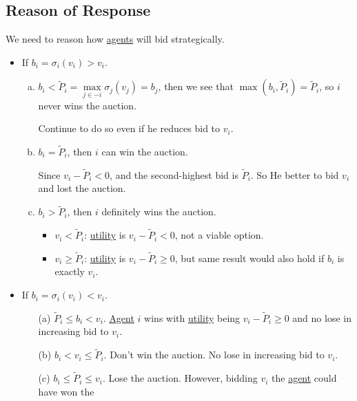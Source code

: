 \subsection{Reason of Response}
We need to reason how \hyperref[def:player]{agents} will bid strategically.
\begin{itemize}
	\item If \(b_{i} = \sigma_{i}(v_{i})>v_{i}\).
	      \begin{enumerate}[(a)]
		      \item \(b_{i}< \widetilde{P}_i = \max\limits_{j\in -i}\sigma_{j}(v_{j}) = b_{j}\), then we see that
		            \(\max(b_{i}, \widetilde{P}_{i}) = \widetilde{P}_{i}\), so \(i\) never wins the auction.
		            \par Continue to do so even if he reduces bid to \(v_{i}\).
		      \item \(b_{i} = \widetilde{P}_{i}\), then \(i\) can win the auction.
		            \par Since \(v_{i} - \widetilde{P}_{i}<0\),  and the second-highest bid is \(\widetilde{P}_{i}\). So He better to bid \(v_{i}\) and
		            lost the auction.
		      \item \(b_{i} > \widetilde{P}_{i}\), then \(i\) definitely wins the auction.
		            \begin{itemize}
			            \item \(v_{i}<\widetilde{P}_{i}\): \hyperref[def:reward]{utility}  is \(v_{i} - \widetilde{P}_{i}<0\), not a viable option.
			            \item \(v_{i}\geq \widetilde{P}_{i}\): \hyperref[def:reward]{utility}  is \(v_{i} - \widetilde{P}_{i}\geq 0\), but
			                  same result would also hold if \(b_{i}\) is exactly \(v_{i}\).
		            \end{itemize}
	      \end{enumerate}
	\item  If \(b_{i} = \sigma_{i}(v_{i})<v_{i}\).
	      \begin{enumerate}
		      \item[(a)] \(\widetilde{P}_{i}\leq b_{i}<v_{i}\). \hyperref[def:player]{Agent} \(i\) wins with \hyperref[def:reward]{utility}  being \(v_{i} - \widetilde{P}_{i}\geq 0\) and
			      no lose in increasing bid to \(v_{i}\).
		      \item[(b)] \(b_{i}< v_{i}\leq \widetilde{P}_{i}\). Don't win the auction. No lose in increasing bid to \(v_{i}\).
		      \item[(c)] \(b_{i}\leq \widetilde{P}_{i}\leq v_{i}\). Lose the auction. However, bidding \(v_{i}\) the \hyperref[def:player]{agent} could have won the

\end{enumerate}
\end{itemize}
